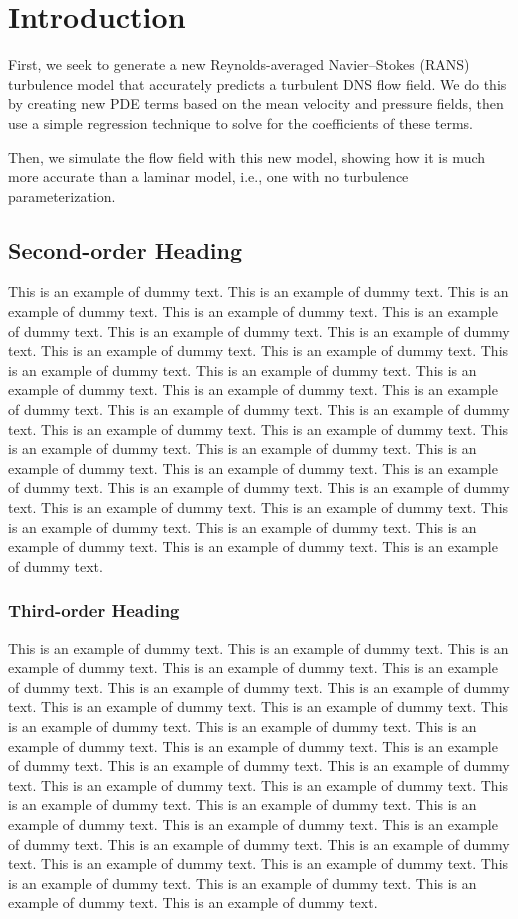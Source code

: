 \documentclass[lineno]{jfm}
\begin{document}
\section{Introduction}
\label{sec:introduction}

First, we seek to generate a new Reynolds-averaged Navier--Stokes (RANS)
turbulence model that accurately predicts a turbulent DNS flow field.
We do this by creating new PDE terms based on the mean velocity and pressure
fields,
then use a simple regression technique to solve for the coefficients of
these terms.

Then, we simulate the flow field with this new model, showing how it is
much more accurate than a laminar model, i.e., one with no turbulence
parameterization.

\subsection {Second-order Heading}
 This is an example of dummy text. This is an example of dummy text. This is an example of dummy text. This is an example of dummy text. This is an example of dummy text. This is an example of dummy text. This is an example of dummy text. This is an example of dummy text. This is an example of dummy text. This is an example of dummy text. This is an example of dummy text. This is an example of dummy text.  This is an example of dummy text. This is an example of dummy text. This is an example of dummy text. This is an example of dummy text. This is an example of dummy text. This is an example of dummy text. This is an example of dummy text. This is an example of dummy text. This is an example of dummy text. This is an example of dummy text. This is an example of dummy text. This is an example of dummy text. This is an example of dummy text. This is an example of dummy text. This is an example of dummy text. This is an example of dummy text. This is an example of dummy text. This is an example of dummy text. This is an example of dummy text. This is an example of dummy text.

 \subsubsection {Third-order Heading}
 This is an example of dummy text. This is an example of dummy text. This is an example of dummy text. This is an example of dummy text. This is an example of dummy text. This is an example of dummy text. This is an example of dummy text. This is an example of dummy text. This is an example of dummy text. This is an example of dummy text. This is an example of dummy text. This is an example of dummy text. This is an example of dummy text. This is an example of dummy text. This is an example of dummy text. This is an example of dummy text. This is an example of dummy text. This is an example of dummy text. This is an example of dummy text. This is an example of dummy text. This is an example of dummy text. This is an example of dummy text. This is an example of dummy text. This is an example of dummy text. This is an example of dummy text. This is an example of dummy text. This is an example of dummy text. This is an example of dummy text. This is an example of dummy text. This is an example of dummy text. This is an example of dummy text.
\end{document}
